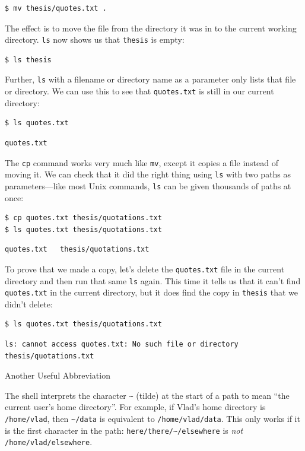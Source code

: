 \documentclass{book}
\begin{document}
\begin{verbatim}
$ mv thesis/quotes.txt .
\end{verbatim}

The effect is to move the file from the directory it was in to the
current working directory. \texttt{ls} now shows us that \texttt{thesis}
is empty:

\begin{verbatim}
$ ls thesis
\end{verbatim}

Further, \texttt{ls} with a filename or directory name as a parameter
only lists that file or directory. We can use this to see that
\texttt{quotes.txt} is still in our current directory:

\begin{verbatim}
$ ls quotes.txt
\end{verbatim}

\begin{verbatim}
quotes.txt
\end{verbatim}

The \texttt{cp} command works very much like \texttt{mv}, except it
copies a file instead of moving it. We can check that it did the right
thing using \texttt{ls} with two paths as parameters---like most Unix
commands, \texttt{ls} can be given thousands of paths at once:

\begin{verbatim}
$ cp quotes.txt thesis/quotations.txt
$ ls quotes.txt thesis/quotations.txt
\end{verbatim}

\begin{verbatim}
quotes.txt   thesis/quotations.txt
\end{verbatim}

To prove that we made a copy, let's delete the \texttt{quotes.txt} file
in the current directory and then run that same \texttt{ls} again. This
time it tells us that it can't find \texttt{quotes.txt} in the current
directory, but it does find the copy in \texttt{thesis} that we didn't
delete:

\begin{verbatim}
$ ls quotes.txt thesis/quotations.txt
\end{verbatim}

\begin{verbatim}
ls: cannot access quotes.txt: No such file or directory
thesis/quotations.txt
\end{verbatim}

\begin{swcbox}{Another Useful Abbreviation}

The shell interprets the character \texttt{\textasciitilde{}} (tilde) at
the start of a path to mean ``the current user's home directory''. For
example, if Vlad's home directory is \texttt{/home/vlad}, then
\texttt{\textasciitilde{}/data} is equivalent to
\texttt{/home/vlad/data}. This only works if it is the first character
in the path: \texttt{here/there/\textasciitilde{}/elsewhere} is
\emph{not} \texttt{/home/vlad/elsewhere}.

\end{swcbox}
\end{document}

